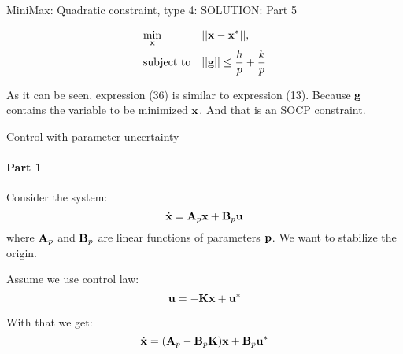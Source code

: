 \documentclass{beamer}
\begin{document}
\begin{frame}{MiniMax: Quadratic constraint, type 4: SOLUTION: Part 5}
\begin{flushleft}

%
\begin{equation}
\begin{aligned}
& \underset{\mathbf{x}}{\text{min}} \
& & ||\mathbf{x} - \mathbf{x}^*||, \\
& \text{subject to}
& & ||\mathbf{g}||\leq \frac{h}{p} + \frac{k}{p}
\end{aligned}
\end{equation}

As it can be seen, expression (36) is similar to expression (13). Because $\mathbf{g}$ contains the variable to be minimized $\mathbf{x}$. And that is an SOCP constraint.

\end{flushleft}
\end{frame}




\begin{frame}{Control with parameter uncertainty}
\framesubtitle{Part 1}
\begin{flushleft}

Consider the system:
%
\begin{equation}
    \dot{\mathbf{x}} = \mathbf{A}_p\mathbf{x} + \mathbf{B}_p\mathbf{u}
\end{equation}
%
where $\mathbf{A}_p$ and $\mathbf{B}_p$ are linear functions of parameters $\mathbf{p}$. We want to stabilize the origin.

\bigskip

Assume we use control law:
%
\begin{equation}
    \mathbf{u} = -\mathbf{K}\mathbf{x} + \mathbf{u}^*
\end{equation}

With that we get:
%
\begin{equation}
   \dot{\mathbf{x}} = (\mathbf{A}_p - \mathbf{B}_p\mathbf{K})\mathbf{x} + \mathbf{B}_p\mathbf{u}^*
\end{equation}


 
\end{flushleft}
\end{frame}
\end{document}
